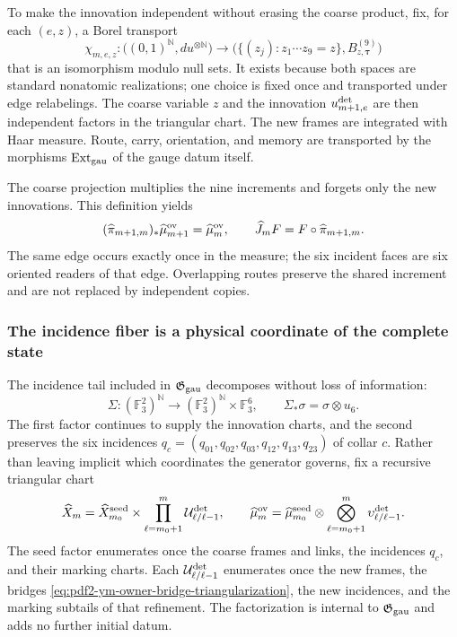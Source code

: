To make the innovation independent without erasing the coarse product, fix, for
each $(e,z)$, a Borel transport
\begin{equation}\label{eq:pdf2-ym-owner-bridge-triangularization}
 \chi_{m,e,z}:\bigl((0,1)^{\mathbb N},du^{\otimes\mathbb N}\bigr)
 \longrightarrow
 \bigl(\{(z_j):z_1\cdots z_9=z\},B_{z,\boldsymbol\tau}^{(9)}\bigr)
\end{equation}
that is an isomorphism modulo null sets. It exists because both spaces are
standard nonatomic realizations; one choice is fixed once and transported under
edge relabelings. The coarse variable $z$ and the innovation $u^{\rm det}_{m+1,e}$
are then independent factors in the triangular chart. The new frames are
integrated with Haar measure. Route, carry, orientation, and memory are transported by the
morphisms $\operatorname{Ext}_{\rm gau}$ of the gauge datum itself.

The coarse projection multiplies the nine increments and forgets only the
new innovations. This definition yields
\begin{equation}\label{eq:pdf2-ym-owner-projectivity}
 (\widehat\pi_{m+1,m})_*\widehat\mu_{m+1}^{\rm ov}
 =\widehat\mu_m^{\rm ov},\qquad
 \widehat J_mF=F\circ\widehat\pi_{m+1,m}.
\end{equation}
The same edge occurs exactly once in the measure; the six incident faces are six
oriented readers of that edge. Overlapping routes preserve the shared
increment and are not replaced by independent copies.

\subsubsection{The incidence fiber is a physical coordinate of the complete state}

The incidence tail included in $\mathfrak G_{\rm gau}$ decomposes without loss of
information:
\begin{equation}\label{eq:pdf2-ym-owner-seed-split}
 \Sigma:(\mathbb F_3^2)^{\mathbb N}\longrightarrow
 (\mathbb F_3^2)^{\mathbb N}\times\mathbb F_3^6,
 \qquad \Sigma_*\sigma=\sigma\otimes u_6.
\end{equation}
The first factor continues to supply the innovation charts, and the second preserves
the six incidences $q_c=(q_{01},q_{02},q_{03},q_{12},q_{13},q_{23})$ of collar
$c$. Rather than leaving implicit which coordinates the generator governs, fix a
recursive triangular chart
\begin{equation}\label{eq:pdf2-ym-owner-product-factorization}
 \widehat X_m
 =\widehat X_{m_0}^{\rm seed}
  \times\prod_{\ell=m_0+1}^{m}
       \mathcal U_{\ell/\ell-1}^{\rm det},
 \qquad
 \widehat\mu_m^{\rm ov}
 =\widehat\mu_{m_0}^{\rm seed}
  \otimes\bigotimes_{\ell=m_0+1}^{m}
       \upsilon_{\ell/\ell-1}^{\rm det}.
\end{equation}
The seed factor enumerates once the coarse frames and links, the incidences
$q_c$, and their marking charts. Each
$\mathcal U_{\ell/\ell-1}^{\rm det}$ enumerates once the new frames, the bridges
\eqref{eq:pdf2-ym-owner-bridge-triangularization}, the new incidences, and the
marking subtails of that refinement. The factorization is internal to
$\mathfrak G_{\rm gau}$ and adds no further initial datum.


